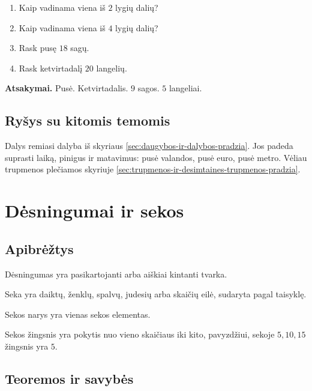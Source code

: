 \begin{enumerate}
\item Kaip vadinama viena iš \(2\) lygių dalių?
\item Kaip vadinama viena iš \(4\) lygių dalių?
\item Rask pusę \(18\) sagų.
\item Rask ketvirtadalį \(20\) langelių.
\end{enumerate}

\textbf{Atsakymai.} Pusė. Ketvirtadalis. \(9\) sagos. \(5\) langeliai.

\subsection{Ryšys su kitomis temomis}

Dalys remiasi dalyba iš skyriaus \ref{sec:daugybos-ir-dalybos-pradzia}. Jos padeda suprasti laiką, pinigus ir matavimus: pusė valandos, pusė euro, pusė metro. Vėliau trupmenos plečiamos skyriuje \ref{sec:trupmenos-ir-desimtaines-trupmenos-pradzia}.

\section{Dėsningumai ir sekos}\label{sec:desningumai-ir-sekos}

\subsection{Apibrėžtys}

\begin{apibreztis}
Dėsningumas yra pasikartojanti arba aiškiai kintanti tvarka.
\end{apibreztis}

\begin{apibreztis}
Seka yra daiktų, ženklų, spalvų, judesių arba skaičių eilė, sudaryta pagal taisyklę.
\end{apibreztis}

\begin{apibreztis}
Sekos narys yra vienas sekos elementas.
\end{apibreztis}

\begin{apibreztis}
Sekos žingsnis yra pokytis nuo vieno skaičiaus iki kito, pavyzdžiui, sekoje \(5,10,15\) žingsnis yra \(5\).
\end{apibreztis}

\subsection{Teoremos ir savybės}

